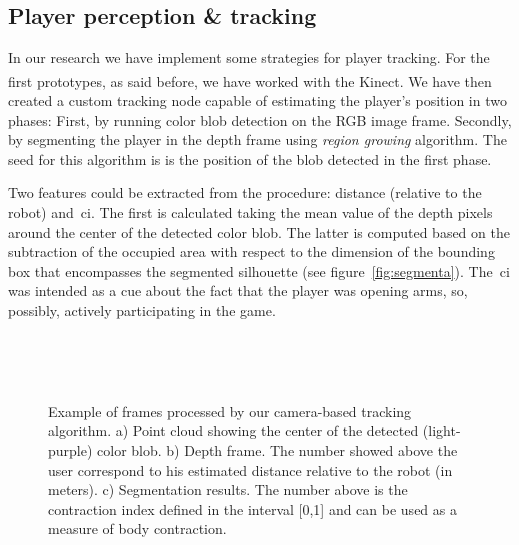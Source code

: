 \subsection{Player perception \& tracking}\label{sec:player_tracking}
In our research we have implement some strategies for player tracking. For the first prototypes, as said before, we have worked with the Kinect\textsuperscript{\textregistered}. %
We have then created a custom tracking node capable of estimating the player's position in two phases: First, by running color blob detection on the RGB image frame. Secondly, by segmenting the player in the depth frame using \textit{region growing} algorithm. The seed for this algorithm is is the position of the blob detected in the first phase.

Two features could be extracted from the procedure: distance (relative to the robot) and~\gls{ci}. The first is calculated taking the mean value of the depth pixels around the center of the detected color blob. The latter is computed based on the subtraction of the occupied area with respect to the dimension of the bounding box that encompasses the segmented silhouette (see figure~\ref{fig:segmenta}). The~\gls{ci} was intended as a cue about the fact that the player was opening arms, so, possibly, actively participating in the game.

\begin{figure}[h]
  \centering 
  \begin{subfigure}[b]{0.3\textwidth}
		\centering
		\caption{}
  \end{subfigure}
  ~
  \begin{subfigure}[b]{0.3\textwidth}
		\centering
		\caption{}
  \end{subfigure}
  ~
  \begin{subfigure}[b]{0.3\textwidth}
		\centering
		\caption{}
  \end{subfigure}
  \caption{Example of frames processed by our camera-based tracking algorithm. a) Point cloud showing the center of the detected (light-purple) color blob. b) Depth frame. The number showed above the user correspond to his estimated distance relative to the robot (in meters). c) Segmentation results. The number above is the contraction index defined in the interval [0,1] and can be used as a measure of body contraction.}\label{fig:segmenta}
   \label{segmentacao}
\end{figure}

